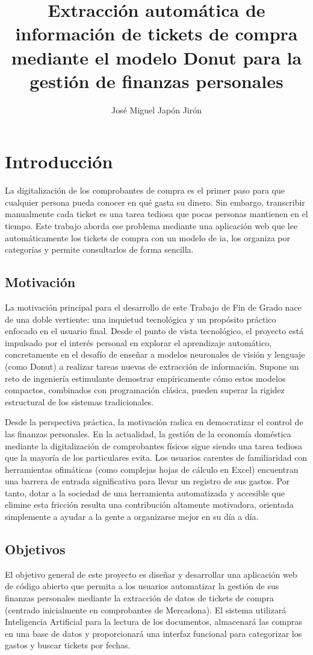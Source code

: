 \documentclass[%
    school=etsisi,%
    type=pfg,%
    degree=61CI,%
]{upm-report}
\title{Extracción automática de información de tickets de compra mediante el modelo Donut para la gestión de finanzas personales}
\author{José Miguel Japón Jirón}
\begin{document}
\chapter{Introducción}
\label{ch:introduccion}

La digitalización de los comprobantes de compra es el primer paso para que cualquier persona pueda conocer en qué gasta su dinero. Sin embargo, transcribir manualmente cada ticket es una tarea tediosa que pocas personas mantienen en el tiempo. Este trabajo aborda ese problema mediante una aplicación web que lee automáticamente los tickets de compra con un modelo de \gls{ia}, los organiza por categorías y permite consultarlos de forma sencilla.

\section{Motivación}
La motivación principal para el desarrollo de este Trabajo de Fin de Grado nace de una doble vertiente: una inquietud tecnológica y un propósito práctico enfocado en el usuario final. Desde el punto de vista tecnológico, el proyecto está impulsado por el interés personal en explorar el aprendizaje automático, concretamente en el desafío de enseñar a modelos neuronales de visión y lenguaje (como Donut) a realizar tareas nuevas de extracción de información. Supone un reto de ingeniería estimulante demostrar empíricamente cómo estos modelos compactos, combinados con programación clásica, pueden superar la rigidez estructural de los sistemas tradicionales.

Desde la perspectiva práctica, la motivación radica en democratizar el control de las finanzas personales. En la actualidad, la gestión de la economía doméstica mediante la digitalización de comprobantes físicos sigue siendo una tarea tediosa que la mayoría de los particulares evita. Los usuarios carentes de familiaridad con herramientas ofimáticas (como complejas hojas de cálculo en Excel) encuentran una barrera de entrada significativa para llevar un registro de sus gastos. Por tanto, dotar a la sociedad de una herramienta automatizada y accesible que elimine esta fricción resulta una contribución altamente motivadora, orientada simplemente a ayudar a la gente a organizarse mejor en su día a día.

\section{Objetivos}
El objetivo general de este proyecto es diseñar y desarrollar una aplicación web de código abierto que permita a los usuarios automatizar la gestión de sus finanzas personales mediante la extracción de datos de tickets de compra (centrado inicialmente en comprobantes de Mercadona). El sistema utilizará Inteligencia Artificial para la lectura de los documentos, almacenará las compras en una base de datos y proporcionará una interfaz funcional para categorizar los gastos y buscar tickets por fechas.
\end{document}
